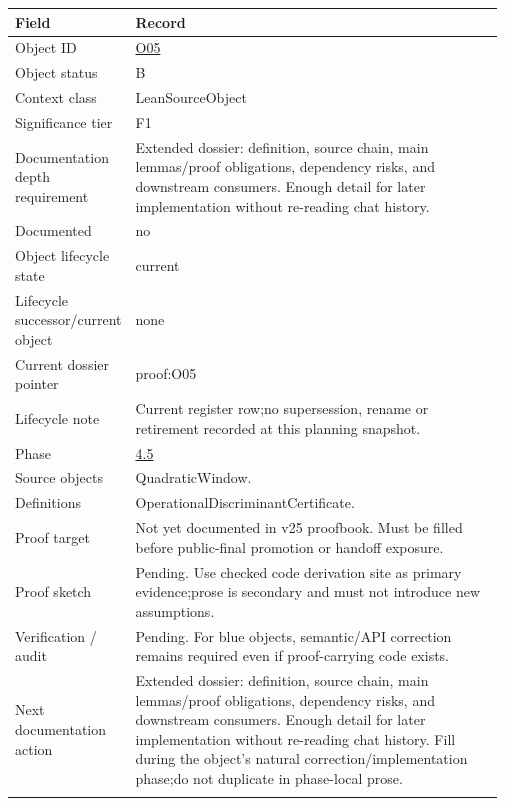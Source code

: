 \begin{longtable}{L{0.16\linewidth} L{0.81\linewidth}}
\hline
\textbf{Field} & \textbf{Record}\\
\hline
Object ID & \hyperlink{object-row-O05}{O05}\\
\hline\addlinespace[0.20em]
Object status & B\\
\hline\addlinespace[0.20em]
Context class & LeanSourceObject\\
\hline\addlinespace[0.20em]
Significance tier & F1\\
\hline\addlinespace[0.20em]
Documentation depth requirement & Extended dossier: definition, source chain, main lemmas/\allowbreak{}proof obligations, dependency risks, and downstream consumers. Enough detail for later implementation without re-reading chat history.\\
\hline\addlinespace[0.20em]
Documented & no\\
\hline\addlinespace[0.20em]
Object lifecycle state & current\\
\hline\addlinespace[0.20em]
Lifecycle successor/\allowbreak{}current object & none\\
\hline\addlinespace[0.20em]
Current dossier pointer & proof:O05\\
\hline\addlinespace[0.20em]
Lifecycle note & Current register row;\newline no supersession, rename or retirement recorded at this planning snapshot.\\
\hline\addlinespace[0.20em]
Phase & \hyperlink{phase-row-4-5}{4.5}\\
\hline\addlinespace[0.20em]
Source objects & QuadraticWindow.\\
\hline\addlinespace[0.20em]
Definitions & OperationalDiscriminantCertificate.\\
\hline\addlinespace[0.20em]
Proof target & Not yet documented in v25 proofbook. Must be filled before public-final promotion or handoff exposure.\\
\hline\addlinespace[0.20em]
Proof sketch & Pending. Use checked code derivation site as primary evidence;\newline prose is secondary and must not introduce new assumptions.\\
\hline\addlinespace[0.20em]
Verification /\allowbreak{} audit & Pending. For blue objects, semantic/\allowbreak{}API correction remains required even if proof-carrying code exists.\\
\hline\addlinespace[0.20em]
Next documentation action & Extended dossier: definition, source chain, main lemmas/\allowbreak{}proof obligations, dependency risks, and downstream consumers. Enough detail for later implementation without re-reading chat history. Fill during the object's natural correction/\allowbreak{}implementation phase;\newline do not duplicate in phase-local prose.\\
\hline\addlinespace[0.20em]
\end{longtable}
